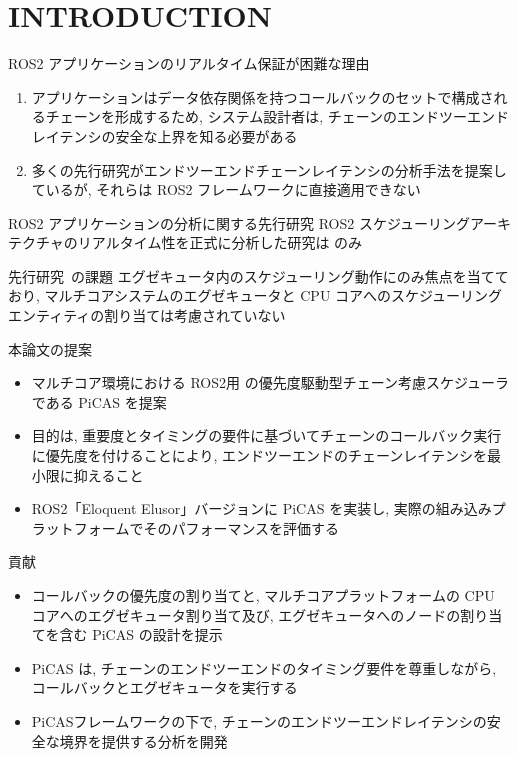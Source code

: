 
\section{INTRODUCTION}
\label{sec: introduction}

\begin{frame}{ROS2 アプリケーションのリアルタイム保証が困難な理由}
    \begin{enumerate}
        \item アプリケーションはデータ依存関係を持つコールバックのセットで構成されるチェーンを形成するため, システム設計者は, チェーンのエンドツーエンドレイテンシの安全な上界を知る必要がある
        \item 多くの先行研究がエンドツーエンドチェーンレイテンシの分析手法を提案しているが, それらは ROS2 フレームワークに直接適用できない
    \end{enumerate}
\end{frame}

\begin{frame}{ROS2 アプリケーションの分析に関する先行研究}
    ROS2 スケジューリングアーキテクチャのリアルタイム性を正式に分析した研究は \cite{casini2019response} のみ
    \begin{block}{先行研究~\cite{casini2019response}の課題}
        エグゼキュータ内のスケジューリング動作にのみ焦点を当てており, マルチコアシステムのエグゼキュータと CPU コアへのスケジューリングエンティティの割り当ては考慮されていない
    \end{block}
\end{frame}

\begin{frame}{本論文の提案}
    \begin{itemize}
        \item マルチコア環境における ROS2用 の優先度駆動型チェーン考慮スケジューラである PiCAS を提案
        \item 目的は, 重要度とタイミングの要件に基づいてチェーンのコールバック実行に優先度を付けることにより, エンドツーエンドのチェーンレイテンシを最小限に抑えること
        \item ROS2「Eloquent Elusor」バージョンに PiCAS を実装し, 実際の組み込みプラットフォームでそのパフォーマンスを評価する
    \end{itemize}
\end{frame}

\begin{frame}{貢献}
    \begin{itemize}
        \item  コールバックの優先度の割り当てと, マルチコアプラットフォームの CPU コアへのエグゼキュータ割り当て及び, エグゼキュータへのノードの割り当てを含む PiCAS の設計を提示
        \item PiCAS は, チェーンのエンドツーエンドのタイミング要件を尊重しながら, コールバックとエグゼキュータを実行する
        \item  PiCASフレームワークの下で, チェーンのエンドツーエンドレイテンシの安全な境界を提供する分析を開発
    \end{itemize}
\end{frame}
